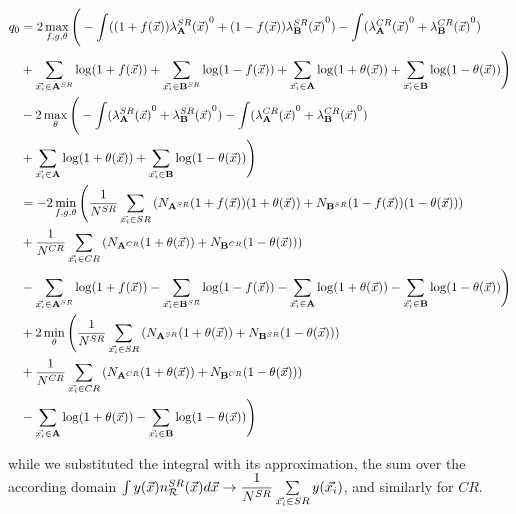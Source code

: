 \documentclass[paper/ddppaper2.tex]{subfiles}
\begin{document}
\begin{wideequations}
\begin{equation}
\begin{aligned}
{q_{0}} &= 2 \max\limits_{f, g, {\theta}} \Bigg(
    - \int ((1 + f(\vec{{x}})){{\lambda}_{{\mathbf{A}}}^{SR}(\vec{{x}})}^0 + (1 - f(\vec{{x}})){{\lambda}_{{\mathbf{B}}}^{SR}(\vec{{x}})}^0)
    - \int ({{\lambda}_{{\mathbf{A}}}^{CR}(\vec{{x}})}^0 + {{\lambda}_{{\mathbf{B}}}^{CR}(\vec{{x}})}^0)
    \\&
    + \sum\limits_{{\vec{{x}_i}} \in {{\mathbf{A}}^{SR}}} \log (1 + f(\vec{{x}}))
    + \sum\limits_{{\vec{{x}_i}} \in {{\mathbf{B}}^{SR}}} \log (1 - f(\vec{{x}}))
    + \sum\limits_{{\vec{{x}_i}} \in {\mathbf{A}}} \log(1 + {{\theta}(\vec{{x}})})
    + \sum\limits_{{\vec{{x}_i}} \in {\mathbf{B}}} \log(1 - {{\theta}(\vec{{x}})})
\Bigg)
\\&
- 2 \max\limits_{{\theta}} \Bigg(
    - \int ({{\lambda}_{{\mathbf{A}}}^{SR}(\vec{{x}})}^0 + {{\lambda}_{{\mathbf{B}}}^{SR}(\vec{{x}})}^0)
    - \int ({{\lambda}_{{\mathbf{A}}}^{CR}(\vec{{x}})}^0 + {{\lambda}_{{\mathbf{B}}}^{CR}(\vec{{x}})}^0)
    \\&
    + \sum\limits_{{\vec{{x}_i}} \in {\mathbf{A}}} \log(1 + {{\theta}(\vec{{x}})})
    + \sum\limits_{{\vec{{x}_i}} \in {\mathbf{B}}} \log(1 - {{\theta}(\vec{{x}})})
\Bigg) \\
&= - 2 \min\limits_{f, g, {\theta}} \Bigg(
    \dfrac{1}{N^{SR}} \sum\limits_{{\vec{{x}_i}} \in SR} \left(
        N_{{\mathbf{A}}^{SR}} (1 + f(\vec{{x}})) (1 + {{\theta}(\vec{{x}})})
        + N_{{\mathbf{B}}^{SR}}(1 - f(\vec{{x}})) (1 - {{\theta}(\vec{{x}})})
    \right)
    \\&
    + \dfrac{1}{N^{CR}} \sum\limits_{{\vec{{x}_i}} \in CR} \left(
        N_{{\mathbf{A}}^{CR}} (1 + {{\theta}(\vec{{x}})})
        + N_{{\mathbf{B}}^{CR}} (1 - {{\theta}(\vec{{x}})})
    \right)
    \\&
    - \sum\limits_{{\vec{{x}_i}} \in {{\mathbf{A}}^{SR}}} \log (1 + f(\vec{{x}}))
    - \sum\limits_{{\vec{{x}_i}} \in {{\mathbf{B}}^{SR}}} \log (1 - f(\vec{{x}}))
    - \sum\limits_{{\vec{{x}_i}} \in {\mathbf{A}}} \log(1 + {{\theta}(\vec{{x}})})
    - \sum\limits_{{\vec{{x}_i}} \in {\mathbf{B}}} \log(1 - {{\theta}(\vec{{x}})})
\Bigg)
\\&
+ 2 \min\limits_{{\theta}} \Bigg(
    \dfrac{1}{N^{SR}} \sum\limits_{{\vec{{x}_i}} \in SR} \left(
        N_{{\mathbf{A}}^{SR}} (1 + {{\theta}(\vec{{x}})})
        + N_{{\mathbf{B}}^{SR}}(1 - {{\theta}(\vec{{x}})})
    \right) \\&
    + \dfrac{1}{N^{CR}} \sum\limits_{{\vec{{x}_i}} \in CR} \left(
        N_{{\mathbf{A}}^{CR}} (1 + {{\theta}(\vec{{x}})})
        + N_{{\mathbf{B}}^{CR}}(1 - {{\theta}(\vec{{x}})})
    \right)
    \\&
    - \sum\limits_{{\vec{{x}_i}} \in {\mathbf{A}}} \log(1 + {{\theta}(\vec{{x}})})
    - \sum\limits_{{\vec{{x}_i}} \in {\mathbf{B}}} \log(1 - {{\theta}(\vec{{x}})})
\Bigg)
\end{aligned}
\end{equation}
\end{wideequations}

\noindent while we substituted the integral with its approximation, the sum over the according domain $\int y(\vec{{x}}) n_{\mathcal{R}}^{SR}({\vec{{x}}}) d\vec{{x}} \to \dfrac{1}{N^{SR}} \sum\limits_{{\vec{{x}_i}} \in SR} y({\vec{{x}_i}})$, and similarly for $CR$.
\end{document}
